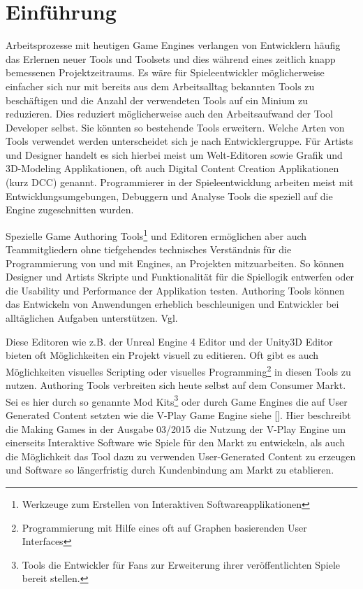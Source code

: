 \documentclass[pagesize, paper=a4, fontsize=12pt, titlepage=true, headings=small, headnosepline, abstractoff, liststotoc, nochapterprefix, plainheadsepline, twoside]{scrreprt}
\begin{document}
\chapter{Einführung}
Arbeitsprozesse mit heutigen Game Engines verlangen von Entwicklern häufig das Erlernen neuer Tools und Toolsets und dies während eines zeitlich knapp bemessenen Projektzeitraums. Es wäre für Spieleentwickler möglicherweise einfacher sich nur mit bereits aus dem Arbeitsalltag bekannten Tools zu beschäftigen und die Anzahl der verwendeten Tools auf ein Minium zu reduzieren. Dies reduziert möglicherweise auch den Arbeitsaufwand der Tool Developer selbst. Sie könnten so bestehende Tools erweitern. Welche Arten von Tools verwendet werden unterscheidet sich je nach Entwicklergruppe. Für Artists und Designer handelt es sich hierbei meist um Welt-Editoren sowie Grafik und 3D-Modeling Applikationen, oft auch Digital Content Creation Applikationen (kurz DCC) genannt. Programmierer in der Spieleentwicklung arbeiten meist mit Entwicklungsumgebungen, Debuggern und Analyse Tools die speziell auf die Engine zugeschnitten wurden.

Spezielle Game Authoring Tools\footnote{Werkzeuge zum Erstellen von Interaktiven Softwareapplikationen} und Editoren ermöglichen aber auch Teammitgliedern ohne tiefgehendes technisches Verständnis für die Programmierung von und mit Engines, an Projekten mitzuarbeiten. So können Designer und Artists Skripte und Funktionalität für die Spiellogik entwerfen oder die Usability und Performance der Applikation testen. Authoring Tools können das Entwickeln von Anwendungen erheblich beschleunigen und Entwickler bei alltäglichen Aufgaben unterstützen. Vgl. 

Diese Editoren wie z.B. der Unreal Engine 4 Editor und der Unity3D Editor bieten oft Möglichkeiten ein Projekt visuell zu editieren. Oft gibt es auch Möglichkeiten visuelles Scripting oder visuelles Programming\footnote{Programmierung mit Hilfe eines oft auf Graphen basierenden User Interfaces} in diesen Tools zu nutzen. Authoring Tools verbreiten sich heute selbst auf dem Consumer Markt. Sei es hier durch so genannte Mod Kits\footnote{Tools die Entwickler für Fans zur Erweiterung ihrer veröffentlichten Spiele bereit stellen.} oder durch Game Engines die auf User Generated Content setzten wie die V-Play Game Engine siehe []. Hier beschreibt die Making Games in der Ausgabe 03/2015 die Nutzung der V-Play Engine um einerseits Interaktive Software wie Spiele für den Markt zu entwickeln, als auch die Möglichkeit das Tool dazu zu verwenden User-Generated Content zu erzeugen und Software so längerfristig durch Kundenbindung am Markt zu etablieren.
\end{document}
